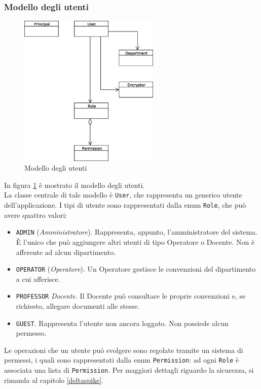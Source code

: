 \subsubsection{Modello degli utenti}

\begin{figure}[h]
	\centering
	\includegraphics[width=0.6\textwidth]{user_model.eps}
	\caption{Modello degli utenti}
	\label{user_model}
\end{figure}

In figura \ref{user_model} è mostrato il modello degli utenti. \\
La classe centrale di tale modello è \texttt{User}, che rappresenta un generico utente dell'applicazione. I tipi di utente sono rappresentati dalla enum \texttt{Role}, che può avere quattro valori:

\begin{itemize}
\item \texttt{ADMIN} (\textsl{Amministratore}). Rappresenta, appunto, l'amministratore del sistema. È l'unico che può aggiungere altri utenti di tipo Operatore o Docente. Non è afferente ad alcun dipartimento.
\item \texttt{OPERATOR} (\textsl{Operatore}). Un Operatore gestisce le convenzioni del dipartimento a cui afferisce.
\item \texttt{PROFESSOR} \textsl{Docente}. Il Docente può consultare le proprie convenzioni e, se richiesto, allegare documenti alle stesse.
\item \texttt{GUEST}. Rappresenta l'utente non ancora loggato. Non possiede alcun permesso.
\end{itemize}

Le operazioni che un utente può svolgere sono regolate tramite un sistema di permessi, i quali sono rappresentati dalla enum \texttt{Permission}: ad ogni \texttt{Role} è associata una lista di \texttt{Permission}. Per maggiori dettagli riguardo la sicurezza, si rimanda al capitolo \ref{deltaspike}.\\

